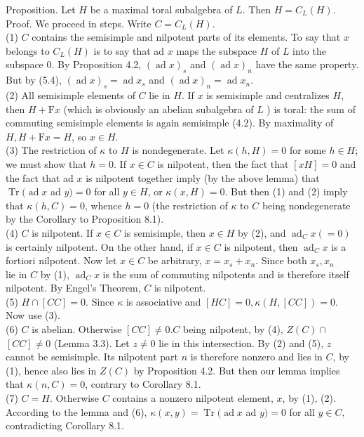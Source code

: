 \documentclass[10pt]{article}
\begin{document}
Proposition. Let $H$ be a maximal toral subalgebra of $L$. Then $H=C_{L}(H)$.\\
Proof. We proceed in steps. Write $C=C_{L}(H)$.\\
(1) $C$ contains the semisimple and nilpotent parts of its elements. To say that $x$ belongs to $C_{L}(H)$ is to say that ad $x$ maps the subspace $H$ of $L$ into the subspace 0. By Proposition 4.2, $(\operatorname{ad} x)_{s}$ and $(\operatorname{ad} x)_{n}$ have the same property. But by (5.4), $(\operatorname{ad} x)_{s}=\operatorname{ad} x_{s}$ and $(\operatorname{ad} x)_{n}=\operatorname{ad} x_{n}$.\\
(2) All semisimple elements of $C$ lie in $H$. If $x$ is semisimple and centralizes $H$, then $H+\mathrm{F} x$ (which is obviously an abelian subalgebra of $L$ ) is toral: the sum of commuting semisimple elements is again semisimple (4.2). By maximality of $H, H+\mathrm{F} x=H$, so $x \in H$.\\
(3) The restriction of $\kappa$ to $H$ is nondegenerate. Let $\kappa(h, H)=0$ for some $h \in H$; we must show that $h=0$. If $x \in C$ is nilpotent, then the fact that $[x H]=0$ and the fact that ad $x$ is nilpotent together imply (by the above lemma) that $\operatorname{Tr}(\operatorname{ad} x$ ad $y)=0$ for all $y \in H$, or $\kappa(x, H)=0$. But then (1) and (2) imply that $\kappa(h, C)=0$, whence $h=0$ (the restriction of $\kappa$ to $C$ being nondegenerate by the Corollary to Proposition 8.1).\\
(4) $C$ is nilpotent. If $x \in C$ is semisimple, then $x \in H$ by (2), and $\operatorname{ad}_{C} x(=0)$ is certainly nilpotent. On the other hand, if $x \in C$ is nilpotent, then $\operatorname{ad}_{C} x$ is a fortiori nilpotent. Now let $x \in C$ be arbitrary, $x=x_{s}+x_{n}$. Since both $x_{s}, x_{n}$\\
lie in $C$ by (1), $\operatorname{ad}_{C} x$ is the sum of commuting nilpotents and is therefore itself nilpotent. By Engel's Theorem, $C$ is nilpotent.\\
(5) $H \cap[C C]=0$. Since $\kappa$ is associative and $[H C]=0, \kappa(H,[C C])=0$. Now use (3).\\
(6) $C$ is abelian. Otherwise $[C C] \neq 0 . C$ being nilpotent, by (4), $Z(C) \cap$ $[C C] \neq 0$ (Lemma 3.3). Let $z \neq 0$ lie in this intersection. By (2) and (5), $z$ cannot be semisimple. Its nilpotent part $n$ is therefore nonzero and lies in $C$, by (1), hence also lies in $Z(C)$ by Proposition 4.2. But then our lemma implies that $\kappa(n, C)=0$, contrary to Corollary 8.1.\\
(7) $C=H$. Otherwise $C$ contains a nonzero nilpotent element, $x$, by (1), (2). According to the lemma and (6), $\kappa(x, y)=\operatorname{Tr}(\operatorname{ad} x$ ad $y)=0$ for all $y \in C$, contradicting Corollary 8.1.
\end{document}
